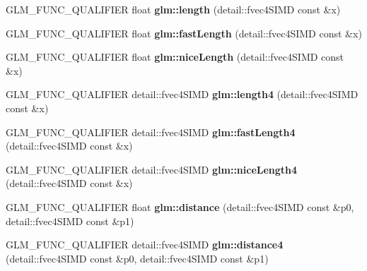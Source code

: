 \begin{DoxyCompactItemize}
\item 
\mbox{\label{simd__vec4_8inl_a65aff7dc68102a01ec2746d2c0c733c7}} 
G\+L\+M\+\_\+\+F\+U\+N\+C\+\_\+\+Q\+U\+A\+L\+I\+F\+I\+ER float {\bfseries glm\+::length} (detail\+::fvec4\+S\+I\+MD const \&x)
\item 
\mbox{\label{simd__vec4_8inl_ae8fababc16f402b8e518982eb08284ef}} 
G\+L\+M\+\_\+\+F\+U\+N\+C\+\_\+\+Q\+U\+A\+L\+I\+F\+I\+ER float {\bfseries glm\+::fast\+Length} (detail\+::fvec4\+S\+I\+MD const \&x)
\item 
\mbox{\label{simd__vec4_8inl_a34a9cfc7cf7fe9b35911cc3013033e61}} 
G\+L\+M\+\_\+\+F\+U\+N\+C\+\_\+\+Q\+U\+A\+L\+I\+F\+I\+ER float {\bfseries glm\+::nice\+Length} (detail\+::fvec4\+S\+I\+MD const \&x)
\item 
\mbox{\label{simd__vec4_8inl_a9de224e4659dd8df0f6cbfe87785ad37}} 
G\+L\+M\+\_\+\+F\+U\+N\+C\+\_\+\+Q\+U\+A\+L\+I\+F\+I\+ER detail\+::fvec4\+S\+I\+MD {\bfseries glm\+::length4} (detail\+::fvec4\+S\+I\+MD const \&x)
\item 
\mbox{\label{simd__vec4_8inl_a07438f3a62641a379456e932dd97b090}} 
G\+L\+M\+\_\+\+F\+U\+N\+C\+\_\+\+Q\+U\+A\+L\+I\+F\+I\+ER detail\+::fvec4\+S\+I\+MD {\bfseries glm\+::fast\+Length4} (detail\+::fvec4\+S\+I\+MD const \&x)
\item 
\mbox{\label{simd__vec4_8inl_a8279db21d38cadc5efaa0c8efababb1b}} 
G\+L\+M\+\_\+\+F\+U\+N\+C\+\_\+\+Q\+U\+A\+L\+I\+F\+I\+ER detail\+::fvec4\+S\+I\+MD {\bfseries glm\+::nice\+Length4} (detail\+::fvec4\+S\+I\+MD const \&x)
\item 
\mbox{\label{simd__vec4_8inl_ae716903872179576658f5eb6e2632558}} 
G\+L\+M\+\_\+\+F\+U\+N\+C\+\_\+\+Q\+U\+A\+L\+I\+F\+I\+ER float {\bfseries glm\+::distance} (detail\+::fvec4\+S\+I\+MD const \&p0, detail\+::fvec4\+S\+I\+MD const \&p1)
\item 
\mbox{\label{simd__vec4_8inl_a5256e6d2d2a82b810f92fc02f64819fb}} 
G\+L\+M\+\_\+\+F\+U\+N\+C\+\_\+\+Q\+U\+A\+L\+I\+F\+I\+ER detail\+::fvec4\+S\+I\+MD {\bfseries glm\+::distance4} (detail\+::fvec4\+S\+I\+MD const \&p0, detail\+::fvec4\+S\+I\+MD const \&p1)

\end{DoxyCompactItemize}
